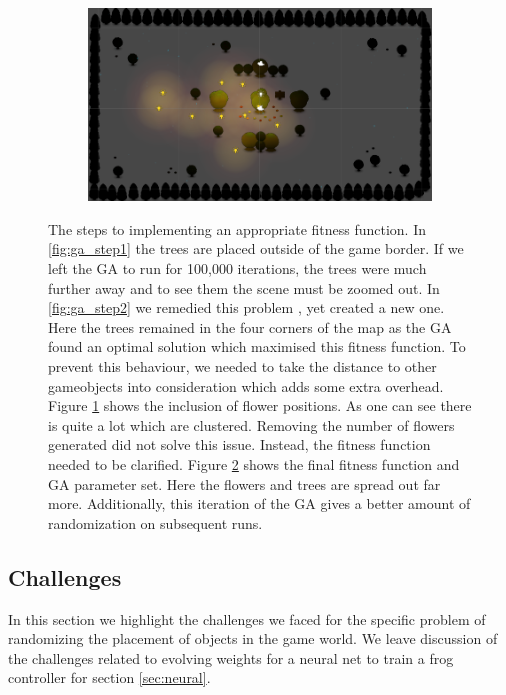 \begin{figure}[h]
\begin{subfigure}[b]{0.5\linewidth}
                \caption{}
                \label{fig:ga_step3}
        \end{subfigure}
        \begin{subfigure}[b]{0.49\linewidth}
               \includegraphics[width=\linewidth]{./ga_final}
           	   \caption{}
               \label{fig:ga_step4}
        \end{subfigure}
        \caption{The steps to implementing an appropriate fitness function. In \ref{fig:ga_step1} the trees are placed 
        outside of the game border. If we left the GA to run for 100,000 iterations, the trees were much further away and 
        to see them the scene must be zoomed out. In \ref{fig:ga_step2} we remedied this problem , yet created a new one. 
        Here the trees remained in the four corners of the map as the GA found an optimal solution which maximised this 
        fitness function. To prevent this behaviour, we needed to take the distance to other gameobjects into consideration which adds some extra overhead. Figure \ref{fig:ga_step3} shows 
        the inclusion of flower positions. As one can see there is quite a lot which are clustered. Removing the number of flowers generated did not solve this issue. Instead, the fitness function needed to be clarified. Figure 
        \ref{fig:ga_step4} shows the final fitness function and GA parameter set. Here the flowers and trees are spread out 
        far more. Additionally, this iteration of the GA gives a better amount of randomization on subsequent 
        runs.}
        \label{fig:GA_Trees}
\end{figure}


\subsection{Challenges}
In this section we highlight the challenges we faced for the specific problem of randomizing
the placement of objects in the game world. We leave discussion of the challenges related to evolving weights
for a neural net to train a frog controller for section \ref{sec:neural}.


